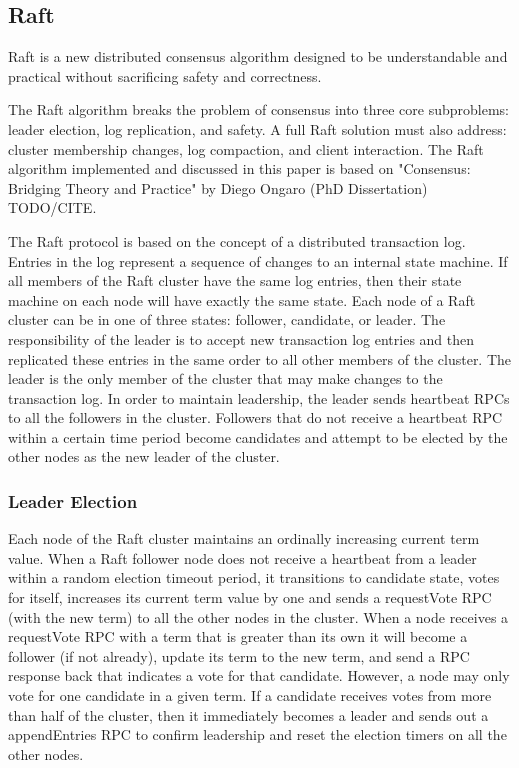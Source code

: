 \documentclass{acmtog} %
\begin{document}
\subsection{Raft}

Raft is a new distributed consensus algorithm designed to be
understandable and practical without sacrificing safety and
correctness.

The Raft algorithm breaks the problem of consensus into three core
subproblems: leader election, log replication, and safety. A full Raft
solution must also address: cluster membership changes, log
compaction, and client interaction. The Raft algorithm implemented and
discussed in this paper is based on "Consensus: Bridging Theory and
Practice" by Diego Ongaro (PhD Dissertation) TODO/CITE.

The Raft protocol is based on the concept of a distributed transaction
log. Entries in the log represent a sequence of changes to an internal
state machine. If all members of the Raft cluster have the same log
entries, then their state machine on each node will have exactly the
same state. Each node of a Raft cluster can be in one of three states:
follower, candidate, or leader. The responsibility of the leader is to
accept new transaction log entries and then replicated these entries
in the same order to all other members of the cluster. The leader is
the only member of the cluster that may make changes to the
transaction log. In order to maintain leadership, the leader sends
heartbeat RPCs to all the followers in the cluster. Followers that
do not receive a heartbeat RPC within a certain time period become
candidates and attempt to be elected by the other nodes as the new
leader of the cluster.

\subsubsection{Leader Election}

Each node of the Raft cluster maintains an ordinally increasing
current term value. When a Raft follower node does not receive
a heartbeat from a leader within a random election timeout period, it
transitions to candidate state, votes for itself, increases its
current term value by one and sends a requestVote RPC (with the
new term) to all the other nodes in the cluster. When a node receives
a requestVote RPC with a term that is greater than its own it will
become a follower (if not already), update its term to the new term,
and send a RPC response back that indicates a vote for that candidate.
However, a node may only vote for one candidate in a given term. If
a candidate receives votes from more than half of the cluster, then it
immediately becomes a leader and sends out a appendEntries RPC to
confirm leadership and reset the election timers on all the other
nodes.
\end{document}
